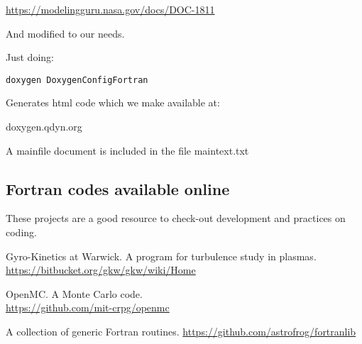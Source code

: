 \documentclass[10pt, oneside, pdftex]{article}
\begin{document}
\url{https://modelingguru.nasa.gov/docs/DOC-1811}

And modified to our needs.

Just doing:

\begin{lstlisting}
doxygen DoxygenConfigFortran
\end{lstlisting}


Generates html code which we make available at:

doxygen.qdyn.org

A mainfile document is included in the file maintext.txt



\subsection{Fortran codes available online}

These  projects  are  a  good resource  to  check-out  development  and
practices on coding.

Gyro-Kinetics at Warwick. A program for turbulence study in plasmas.\\
\url{https://bitbucket.org/gkw/gkw/wiki/Home}

OpenMC. A Monte Carlo code.\\
\url{https://github.com/mit-crpg/openmc}


A collection of generic Fortran routines.
\url{https://github.com/astrofrog/fortranlib}



\end{document}

